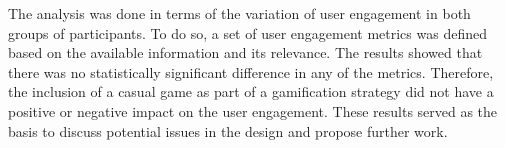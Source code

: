 The analysis was done in terms of the variation of user engagement in both groups of participants. To do so, a set of user engagement metrics was defined based on the available information and its relevance. The results showed that there was no statistically significant difference in any of the metrics. Therefore, the inclusion of a casual game as part of a gamification strategy did not have a positive or negative impact on the user engagement. These results served as the basis to discuss potential issues in the design and propose further work.